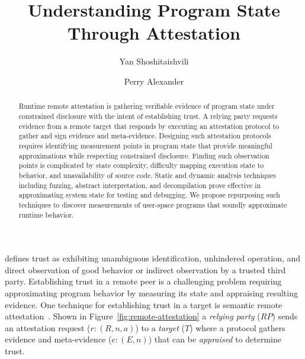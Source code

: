 \documentclass[runningheads]{llncs}
\begin{document}
%
\title{Understanding Program State Through Attestation}
%
%
\author{Yan Shoshitaishvili \and Perry Alexander}
%
%
%
\maketitle              %
%
\begin{abstract}
Runtime remote attestation is gathering verifiable evidence of program state
under constrained disclosure with the intent of establishing trust. A relying
party requests evidence from a remote target that responds by executing an
attestation protocol to gather and sign evidence and meta-evidence.  Designing
such attestation protocols requires identifying measurement points in program
state that provide meaningful approximations while respecting constrained
disclosure.  Finding such observation points is complicated by state complexity,
difficulty mapping execution state to behavior, and unavailability of source
code.  Static and dynamic analysis techniques including fuzzing, abstract
interpretation, and decompilation prove effective in approximating system state
for testing and debugging.  We propose repurposing such techniques to discover
measurements of user-space programs that soundly approximate runtime behavior.

\end{abstract}
%
%
%


\citet{Martin:08:The-ten-page-in} defines trust as exhibiting unambiguous
identification, unhindered operation, and direct observation of good behavior or
indirect observation by a trusted third party. Establishing trust in a remote
peer is a challenging problem requiring approximating program behavior by
measuring its state and appraising resulting evidence. One technique for
establishing trust in a target is semantic remote
attestation~\citep{Haldar:04:Semantic-Remote,Coker::Principles-of-R}.  Shown in
Figure~\ref{fig:remote-attestation} a \emph{relying party} ($RP$) sends an
attestation request ($r:(R,n,a)$) to a \emph{target} ($T$) where a protocol
gathers evidence and meta-evidence ($e:(E,n)$) that can be \emph{appraised} to
determine trust.
\end{document}
